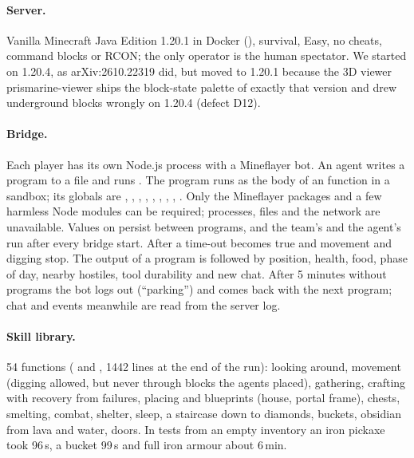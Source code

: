 \documentclass[11pt]{article}
\begin{document}
\paragraph{Server.} Vanilla Minecraft Java Edition 1.20.1 in Docker (), survival, Easy, no cheats, command blocks or RCON; the only operator is the human spectator. We started on 1.20.4, as arXiv:2610.22319 did, but moved to 1.20.1 because the 3D viewer prismarine-viewer ships the block-state palette of exactly that version and drew underground blocks wrongly on 1.20.4 (defect D12).

\paragraph{Bridge.} Each player has its own Node.js process with a Mineflayer bot. An agent writes a program to a file and runs . The program runs as the body of an  function in a  sandbox; its globals are , , , , , , , , . Only the Mineflayer packages and a few harmless Node modules can be required; processes, files and the network are unavailable. Values on  persist between programs, and the team's and the agent's  run after every bridge start. After a time-out  becomes true and movement and digging stop. The output of a program is followed by position, health, food, phase of day, nearby hostiles, tool durability and new chat. After 5 minutes without programs the bot logs out (``parking'') and comes back with the next program; chat and events meanwhile are read from the server log.

\paragraph{Skill library.} 54 functions ( and , 1442 lines at the end of the run): looking around, movement (digging allowed, but never through blocks the agents placed), gathering, crafting with recovery from failures, placing and blueprints (house, portal frame), chests, smelting, combat, shelter, sleep, a staircase down to diamonds, buckets, obsidian from lava and water, doors. In tests from an empty inventory an iron pickaxe took 96\,s, a bucket 99\,s and full iron armour about 6\,min.
\end{document}
